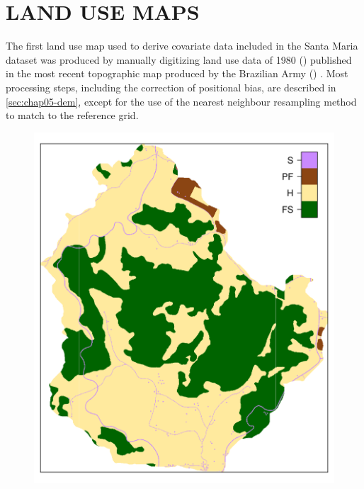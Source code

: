 \section{LAND USE MAPS}
\label{sec:chap05-land-use}

The first land use map used to derive covariate data included in the Santa Maria dataset was produced by 
manually digitizing land use data of \num{1980} (\landOld{}) published in the most recent 
topographic map produced by the Brazilian Army () \cite{DSG1992a, DSG1992}. Most processing 
steps, including the correction of positional bias, are described in \autoref{sec:chap05-dem}, except for 
the use of the nearest neighbour resampling method to match \landOld{} to the reference grid.

\begin{figure}[!ht]
\centering
\begin{minipage}[b]{0.45\textwidth}
\subcaption{}
\centering
\includegraphics[width = \textwidth]{fig/chap05-land-old}
\end{minipage}
\begin{minipage}[b]{0.45\textwidth}
\subcaption{}
\centering

\end{minipage}
\end{figure}
